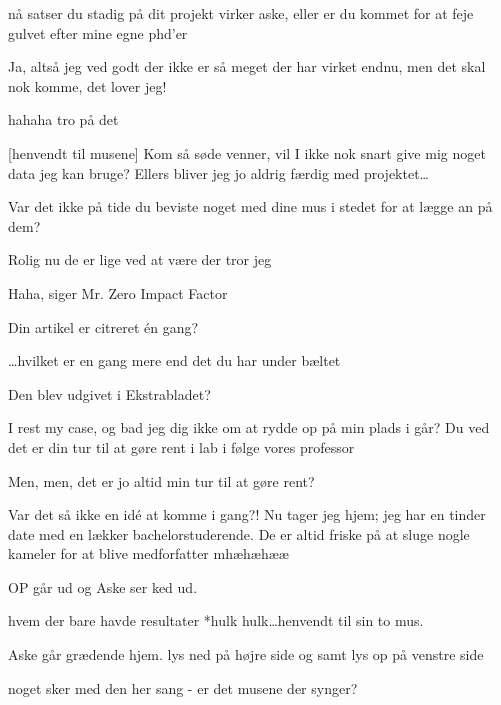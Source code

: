 \documentclass[a4paper,11pt]{article}
\begin{document}
\begin{sketch}



 nå satser du stadig på dit projekt virker aske, eller er du kommet for at feje gulvet efter mine egne phd’er

 Ja, altså jeg ved godt der ikke er så meget der har virket endnu, men det skal nok komme, det lover jeg!

 hahaha tro på det



[henvendt til musene] Kom så søde venner, vil I ikke nok snart give mig noget data jeg kan bruge? Ellers bliver jeg jo aldrig færdig med projektet\ldots



 Var det ikke på tide du beviste noget med dine mus i stedet for at lægge an på dem? 

 Rolig nu de er lige ved at være der tror jeg

 Haha, siger Mr. Zero Impact Factor

 Din artikel er citreret én gang?

 \ldots hvilket er en gang mere end det du har under bæltet

 Den blev udgivet i Ekstrabladet?

 I rest my case, og bad jeg dig ikke om at rydde op på min plads i går? Du ved det er din tur til at gøre rent i lab i følge vores professor

 Men, men, det  er jo altid min tur til at gøre rent?

 Var det så ikke en idé at komme i gang?! Nu tager jeg hjem; jeg har en tinder date med en lækker bachelorstuderende. De er altid friske på at sluge nogle kameler for at blive medforfatter  mhæhæhææ

\scene OP går ud og Aske ser ked ud.

 hvem der bare havde resultater *hulk hulk…henvendt til sin to mus.

\scene Aske går grædende hjem. lys ned på højre side og samt lys op på venstre side

\scene noget sker med den her sang - er det musene der synger?

\end{sketch}
\end{document}
